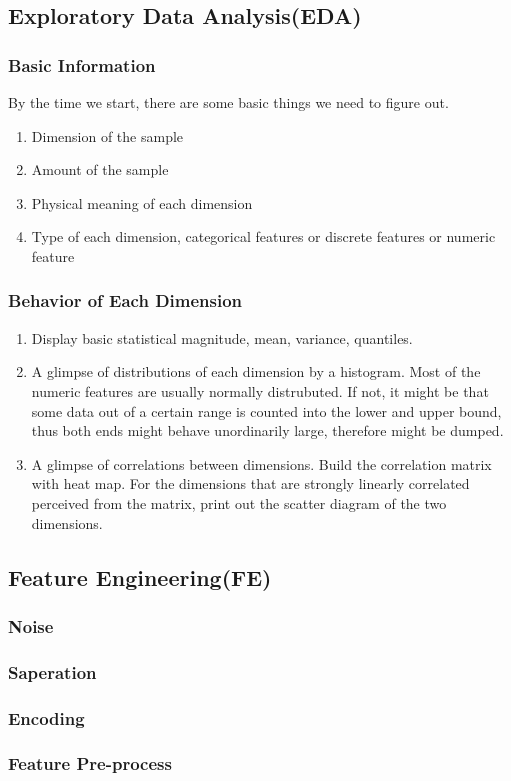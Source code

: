 \documentclass{article}
\begin{document}
\subsection{Exploratory Data Analysis(EDA)}
\subsubsection{Basic Information}
By the time we start, there are some basic things we need to figure out.
\begin{enumerate}
	\item Dimension of the sample
	\item Amount of the sample
	\item Physical meaning of each dimension
	\item Type of each dimension, categorical features or discrete features or numeric feature
\end{enumerate}
\subsubsection{Behavior of Each Dimension}
\begin{enumerate}
	\item Display basic statistical magnitude, mean, variance, quantiles.
	\item A glimpse of distributions of each dimension by a histogram. Most of the numeric features are usually normally distrubuted. If not, it might be that some data out of a certain range is counted into the lower and upper bound, thus both ends might behave unordinarily large, therefore might be dumped.
	\item A glimpse of correlations between dimensions. Build the correlation matrix with heat map. For the dimensions that are strongly linearly correlated perceived from the matrix, print out the scatter diagram of the two dimensions. 
\end{enumerate}
\subsection{Feature Engineering(FE)}

\subsubsection{Noise}
\subsubsection{Saperation}
\subsubsection{Encoding}
\subsubsection{Feature Pre-process}
\end{document}
